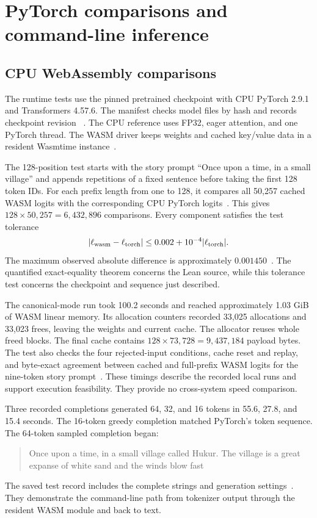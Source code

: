 \section{PyTorch comparisons and command-line inference}\label{sec:tests}
\subsection{CPU WebAssembly comparisons}

The runtime tests use the pinned pretrained checkpoint with CPU PyTorch 2.9.1 and Transformers 4.57.6.  The manifest checks model files by hash and records checkpoint revision ~\cite{manifest}.  The CPU reference uses FP32, eager attention, and one PyTorch thread.  The WASM driver keeps weights and cached key/value data in a resident Wasmtime instance~\cite{driver}.

The 128-position test starts with the story prompt ``Once upon a time, in a small village'' and appends repetitions of a fixed sentence before taking the first 128 token IDs.  For each prefix length from one to 128, it compares all 50,257 cached WASM logits with the corresponding CPU PyTorch logits~\cite{testcode}.  This gives $128\times50{,}257=6{,}432{,}896$ comparisons.  Every component satisfies the test tolerance
\[
|\ell_{\rm wasm}-\ell_{\rm torch}|
\leq 0.002+10^{-4}|\ell_{\rm torch}|.
\]
The maximum observed absolute difference is approximately $0.001450$~\cite{tests}.  The quantified exact-equality theorem concerns the Lean source, while this tolerance test concerns the checkpoint and sequence just described.

The canonical-mode run took 100.2 seconds and reached approximately 1.03 GiB of WASM linear memory.  Its allocation counters recorded 33,025 allocations and 33,023 frees, leaving the weights and current cache.  The allocator reuses whole freed blocks.  The final cache contains $128\times73{,}728=9{,}437{,}184$ payload bytes.  The test also checks the four rejected-input conditions, cache reset and replay, and byte-exact agreement between cached and full-prefix WASM logits for the nine-token story prompt~\cite{tests,testcode}.  These timings describe the recorded local runs and support execution feasibility.  They provide no cross-system speed comparison.

Three recorded completions generated 64, 32, and 16 tokens in 55.6, 27.8, and 15.4 seconds.  The 16-token greedy completion matched PyTorch's token sequence.  The 64-token sampled completion began:
\begin{quote}
Once upon a time, in a small village called Hukur. The village is a great expanse of white sand and the winds blow fast
\end{quote}
The saved test record includes the complete strings and generation settings~\cite{tests}.  They demonstrate the command-line path from tokenizer output through the resident WASM module and back to text.

